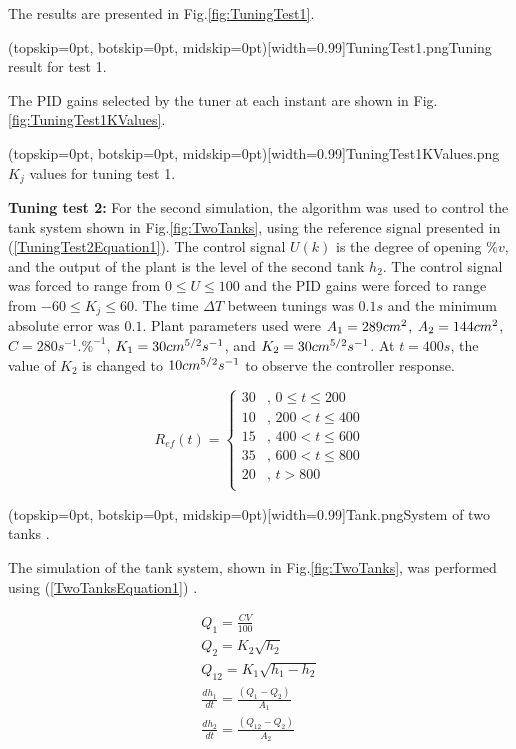 \documentclass{ieeeaccess}
\begin{document}
The results are presented in Fig.\ref{fig:TuningTest1}.

\Figure[ht!](topskip=0pt, botskip=0pt, midskip=0pt)[width=0.99\columnwidth]{TuningTest1.png}{Tuning result for test 1\label{fig:TuningTest1}.}

The PID gains selected by the tuner at each instant are shown in Fig.\ref{fig:TuningTest1KValues}.

\Figure[ht!](topskip=0pt, botskip=0pt, midskip=0pt)[width=0.99\columnwidth]{TuningTest1KValues.png}{\(K_j\) values for tuning test 1\label{fig:TuningTest1KValues}.}

\textbf{Tuning test 2:} For the second simulation, the algorithm was used to control the tank system shown in Fig.\ref{fig:TwoTanks},  using the reference signal presented in (\ref{TuningTest2Equation1}). The control signal \(U(k)\) is the degree of opening \(\%v\), and the output of the plant is the level of the second tank \(h_2\). The control signal was forced to range from \(0\le U\le100\) and the PID gains were forced to range from \(-60\le K_j\le60\). The time \(\Delta T\) between tunings was \(0.1s\) and the minimum absolute error was \(0.1\). Plant parameters used were \( A_1=289{\rm cm}^2\), \(A_2=144{\rm cm}^2\), \(C=280s^ {-1}.\%^{-1}\), \(K_1=30{\rm cm}^{5/2}s^{-1}\), and \(K_2=30{ \rm cm}^{5/2}s^{-1}\). At \(t=400 s\), the value of \(K_2\) is changed to \(10{\rm cm}^{5/2}s^{-1}\) to observe the controller response.

\begin{equation}\label{TuningTest2Equation1}
	R_{ef} (t)=
 \begin{cases}
 30 &,\, 0 \leq t \leq 200\\
 10 &,\, 200<t \leq 400\\
 15 &,\, 400<t \leq 600\\
 35 &,\, 600<t \leq 800\\
 20 &,\, t>800\\
 \end{cases}
\end{equation}

\Figure[ht!](topskip=0pt, botskip=0pt, midskip=0pt)[width=0.99\columnwidth]{Tank.png}{System of two tanks \cite{pirabakaran_pid_2002}\label{fig:TwoTanks}.}

The simulation of the tank system, shown in Fig.\ref{fig:TwoTanks}, was performed using (\ref{TwoTanksEquation1}) \cite{pirabakaran_pid_2002}.

\begin{equation}\label{TwoTanksEquation1}
 \begin{matrix}
 Q_1=\frac{CV}{100}\\
 Q_2=K_2\sqrt{h_2}\\
 Q_{12}=K_1\sqrt{h_1-h_2}\\
 \frac{dh_1}{dt}=\frac{(Q_1-Q_2)}{A_1}\\
 \frac{dh_2}{dt}=\frac{(Q_{12}-Q_2)}{A_2}\\
 \end{matrix}
\end{equation}
\end{document}
